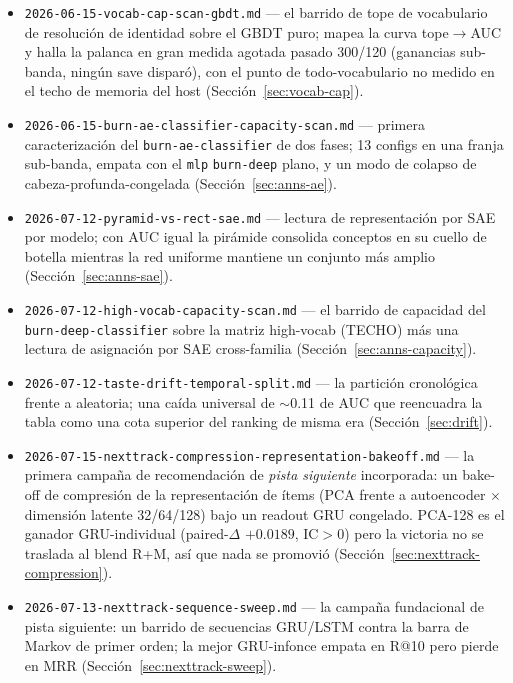 \documentclass[11pt]{article}
\begin{document}
\begin{itemize}
    convergente (Sección~\ref{sec:leaf-head}).
  \item \texttt{2026-06-15-vocab-cap-scan-gbdt.md} --- el barrido de tope de
    vocabulario de resolución de identidad sobre el GBDT puro; mapea la curva
    tope$\to$AUC y halla la palanca en gran medida agotada pasado 300/120 (ganancias
    sub-banda, ningún save disparó), con el punto de todo-vocabulario no medido en el
    techo de memoria del host (Sección~\ref{sec:vocab-cap}).
  \item \texttt{2026-06-15-burn-ae-classifier-capacity-scan.md} --- primera
    caracterización del \texttt{burn-ae-classifier} de dos fases; 13 configs en una
    franja sub-banda, empata con el \texttt{mlp} \texttt{burn-deep} plano, y un modo
    de colapso de cabeza-profunda-congelada (Sección~\ref{sec:anns-ae}).
  \item \texttt{2026-07-12-pyramid-vs-rect-sae.md} --- lectura de representación por
    SAE por modelo; con AUC igual la pirámide consolida conceptos en su cuello de
    botella mientras la red uniforme mantiene un conjunto más amplio
    (Sección~\ref{sec:anns-sae}).
  \item \texttt{2026-07-12-high-vocab-capacity-scan.md} --- el barrido de capacidad
    del \texttt{burn-deep-classifier} sobre la matriz high-vocab (TECHO) más una
    lectura de asignación por SAE cross-familia (Sección~\ref{sec:anns-capacity}).
  \item \texttt{2026-07-12-taste-drift-temporal-split.md} --- la partición
    cronológica frente a aleatoria; una caída universal de $\sim$0.11 de AUC que
    reencuadra la tabla como una cota superior del ranking de misma era
    (Sección~\ref{sec:drift}).
  \item \texttt{2026-07-15-nexttrack-compression-representation-bakeoff.md} --- la
    primera campaña de recomendación de \emph{pista siguiente} incorporada: un
    bake-off de compresión de la representación de ítems (PCA frente a autoencoder
    $\times$ dimensión latente 32/64/128) bajo un readout GRU congelado. PCA-128 es
    el ganador GRU-individual (paired-$\Delta$ $+0.0189$, IC$>$0) pero la victoria no
    se traslada al blend R+M, así que nada se promovió
    (Sección~\ref{sec:nexttrack-compression}).
  \item \texttt{2026-07-13-nexttrack-sequence-sweep.md} --- la campaña fundacional de
    pista siguiente: un barrido de secuencias GRU/LSTM contra la barra de Markov de
    primer orden; la mejor GRU-infonce empata en R@10 pero pierde en MRR
    (Sección~\ref{sec:nexttrack-sweep}).

\end{itemize}
\end{document}
